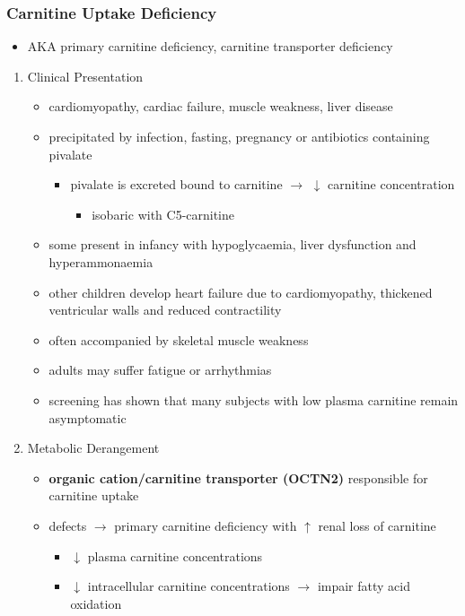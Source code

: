 \documentclass[12pt]{scrartcl}
\begin{document}
\subsubsection{Carnitine Uptake Deficiency}
\label{sec:org182dc4f}
\begin{itemize}
\item AKA primary carnitine deficiency, carnitine transporter deficiency
\end{itemize}
\begin{enumerate}
\item Clinical Presentation
\label{sec:orgfd16eae}
\begin{itemize}
\item cardiomyopathy, cardiac failure, muscle weakness, liver disease
\item precipitated by infection, fasting, pregnancy or antibiotics containing pivalate
\begin{itemize}
\item pivalate is excreted bound to carnitine \(\to\) \(\downarrow\) carnitine concentration
\begin{itemize}
\item isobaric with C5-carnitine
\end{itemize}
\end{itemize}
\item some present in infancy with hypoglycaemia, liver dysfunction and hyperammonaemia
\item other children develop heart failure due to cardiomyopathy,
thickened ventricular walls and reduced contractility
\item often accompanied by skeletal muscle weakness
\item adults may suffer fatigue or arrhythmias
\item screening has shown that many subjects with low plasma carnitine remain asymptomatic
\end{itemize}
\item Metabolic Derangement
\label{sec:org71d4594}
\begin{itemize}
\item \textbf{organic cation/carnitine transporter (OCTN2)} responsible for
carnitine uptake
\item defects \(\to\) primary carnitine deficiency with \(\uparrow\) renal loss of carnitine
\begin{itemize}
\item \(\downarrow\) plasma carnitine concentrations
\item \(\downarrow\) intracellular carnitine concentrations \(\to\) impair fatty acid
oxidation
\end{itemize}
\end{itemize}


\end{enumerate}
\end{document}
